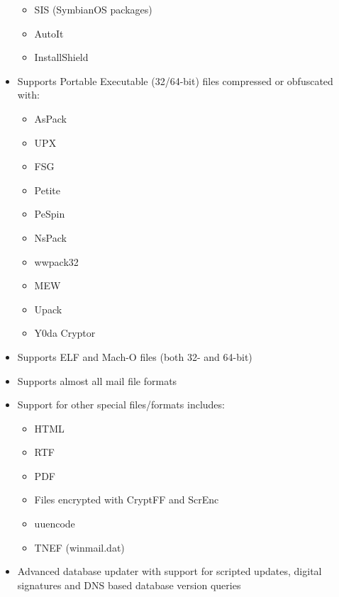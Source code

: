 \documentclass[a4paper,titlepage,12pt]{article}
\begin{document}
\begin{itemize}
{\begin{itemize}
		\item SIS (SymbianOS packages)
		\item AutoIt
		\item InstallShield
	    \end{itemize}}
	\item{Supports Portable Executable (32/64-bit) files compressed or obfuscated with:}
	    \begin{itemize}
		\item AsPack
		\item UPX
		\item FSG
		\item Petite
		\item PeSpin
		\item NsPack
		\item wwpack32
		\item MEW
		\item Upack
		\item Y0da Cryptor
	    \end{itemize}
	\item{Supports ELF and Mach-O files (both 32- and 64-bit)}
	\item{Supports almost all mail file formats}
	\item{Support for other special files/formats includes:}
	    \begin{itemize}
		\item HTML
		\item RTF
		\item PDF
		\item Files encrypted with CryptFF and ScrEnc
		\item uuencode
		\item TNEF (winmail.dat)
	    \end{itemize}
	\item{Advanced database updater with support for scripted updates,
	      digital signatures and DNS based database version queries}
    \end{itemize}
\end{document}
